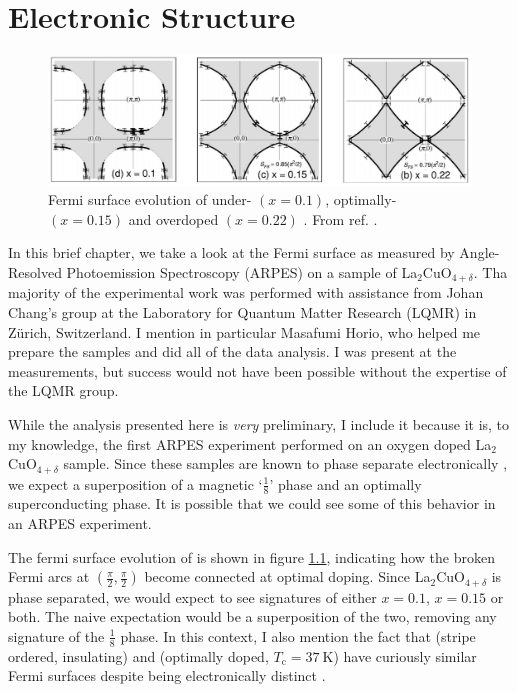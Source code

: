 \chapter{Electronic Structure}\label{ch:arpes}

\begin{figure}[]
    \centering
    \includegraphics[width=\textwidth]{fig/arpes/lsco_fs.png}
    \caption{Fermi surface evolution of under- $(x=0.1)$, optimally- $(x=0.15)$ and overdoped $(x=0.22)$ \LSCO{}. From ref. \cite{Ino2002}.}
    \label{fig:lsco_fs}
\end{figure}

In this brief chapter, we take a look at the Fermi surface as measured by Angle-Resolved Photoemission Spectroscopy (ARPES) on a sample of La$_2$CuO$_{4+\delta}$. Tha majority of the experimental work was performed with assistance from Johan Chang's group at the Laboratory for Quantum Matter Research (LQMR) in Z\"urich, Switzerland. I mention in particular Masafumi Horio, who helped me prepare the samples and did all of the data analysis. I was present at the measurements, but success would not have been possible without the expertise of the LQMR group.

While the analysis presented here is \emph{very} preliminary, I include it because it is, to my knowledge, the first ARPES experiment performed on an oxygen doped La$_2$CuO$_{4+\delta}$ sample. Since these samples are known to phase separate electronically \cite{Udby2013}, we expect a superposition of a magnetic `$\frac{1}{8}$' phase and an optimally superconducting phase. It is possible that we could see some of this behavior in an ARPES experiment.

The fermi surface evolution of \LSCO{} is shown in figure \ref{fig:lsco_fs}, indicating how the broken Fermi arcs at $\left( \frac{\pi}{2},\frac{\pi}{2} \right)$ become connected at optimal doping. Since La$_2$CuO$_{4+\delta}$ is phase separated, we would expect to see signatures of either $x=0.1$, $x=0.15$ or both. The naive expectation would be a superposition of the two, removing any signature of the $\frac{1}{8}$ phase. In this context, I also mention the fact that \LNSCO{} (stripe ordered, insulating) and \LSCOopt{} (optimally doped, $T_\text{c} = \SI{37}{\kelvin}$) have curiously similar Fermi surfaces despite being electronically distinct \cite{Zhou2001}.

